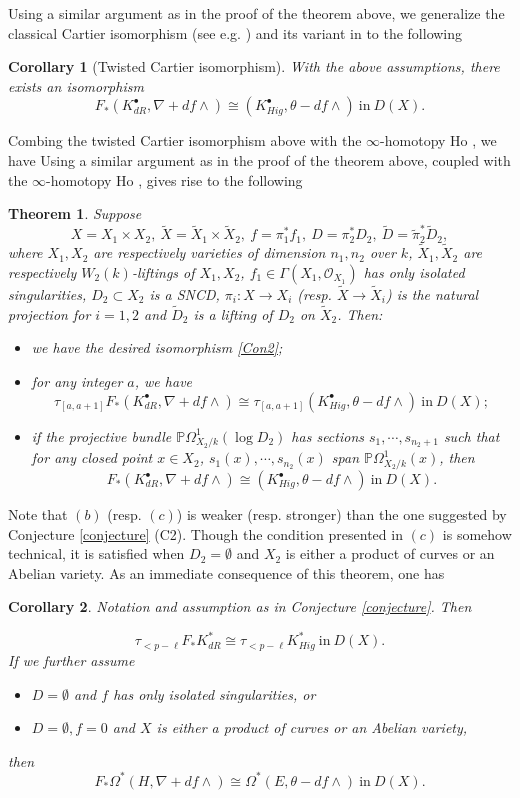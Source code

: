 \documentclass[12pt, a4paper]{article}
\newtheorem{theorem}{Theorem}[section]
\newtheorem{corollary}{Corollary}[section]
\begin{document}
Using a similar argument as in the proof of the theorem above, we generalize the classical Cartier isomorphism (see e.g. \cite[Théorème 1.2]{DI}) and its variant in \cite[Proposition 3.8]{SZ2} to the following
\begin{corollary}[Twisted Cartier isomorphism]
With the above assumptions, there exists an isomorphism
$$F_*(K^\bullet_{dR},\nabla+df\wedge)\cong(K^\bullet_{Hig},\theta-df\wedge)~\mathrm{in}~D(X).$$
\end{corollary}
Combing the twisted Cartier isomorphism above with the $\infty$-homotopy $\mathrm{Ho}$ \cite[Theorem 3.5]{SZ2}, we have
\fi
Using a similar argument as in the proof of the theorem above, coupled with the $\infty$-homotopy $\mathrm{Ho}$ \cite[theorem 3.5]{SZ2}, gives rise to the following
\begin{theorem}\label{Main B}
Suppose 
$$X=X_1\times X_2,~\tilde X=\tilde X_1\times\tilde X_2,~f=\pi^*_1f_1,~D=\pi^*_2D_2,~\tilde D=\tilde\pi^*_2\tilde D_2,$$
where $X_1,X_2$ are  respectively varieties of dimension $n_1,n_2$ over $k$, $\tilde X_1,\tilde X_2$ are respectively $W_2(k)$-liftings of $X_1,X_2$, $f_1\in\Gamma(X_1,\mathcal O_{X_1})$ has only isolated singularities, $D_2\subset X_2$ is a SNCD, $\pi_i:X\to X_i$ (resp. $\tilde X\to\tilde X_i$) is the natural projection for $i=1,2$ and $\tilde D_2$ is a lifting of $D_2$ on $\tilde X_2$. Then:
\begin{itemize}
    \item[$(a)$\ ] we have the desired isomorphism \eqref{Con2};
    \item[$(b)$\ ] for any integer $a$, we have
$$\tau_{[a,a+1]}F_*(K^\bullet_{dR},\nabla+df\wedge)\cong \tau_{[a,a+1]}(K^\bullet_{Hig},\theta-df\wedge)~\mathrm{in}~D(X);$$
\item[$(c)$\ ] if the projective bundle $\mathbb P\Omega^1_{X_2/k}(\log D_2)$ has sections $s_1,\cdots,s_{n_2+1}$ such that for any closed point $x\in X_2$, $s_1(x),\cdots,s_{n_2}(x)$ span $\mathbb P\Omega^1_{X_2/k}(x)$, then
$$
F_*(K^\bullet_{dR},\nabla+df\wedge)\cong (K^\bullet_{Hig},\theta-df\wedge)~\mathrm{in}~D(X).
$$
\end{itemize}
\end{theorem}
Note that $(b)$ (resp. $(c)$) is weaker (resp. stronger) than the one suggested by Conjecture \ref{conjecture} (C2). Though the condition presented in $(c)$ is somehow technical, it is satisfied when $D_2=\emptyset$ and $X_2$ is either a product of curves or an Abelian variety.
As an immediate consequence of this theorem, one has
\begin{corollary}\label{Main C}
Notation and assumption as in Conjecture \ref{conjecture}.
 Then

    $$\tau_{<p-\ell}F_*K^*_{dR}\cong\tau_{<p-\ell}K^*_{Hig}~\mathrm{in}~D(X).$$
If we further assume 
\begin{itemize}
    \item $D=\emptyset$ and $f$ has only isolated singularities, or
    \item $D=\emptyset, f=0$ and $X$ is  either a product of curves or an Abelian variety, 
\end{itemize}
 then
    $$
    F_*\Omega^*(H,\nabla+df\wedge)\cong\Omega^*(E,\theta-df\wedge)~\mathrm{in}~D(X).
    $$
\end{corollary}
\end{document}
